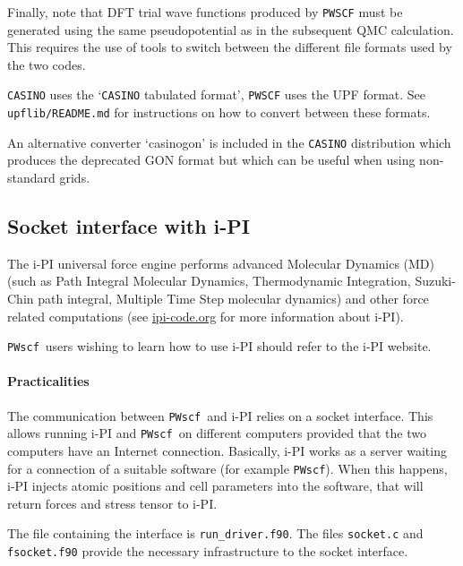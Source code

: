 \documentclass[12pt,a4paper]{article}
\def\PWscf{\texttt{PWscf}}
\begin{document}
Finally, note that DFT trial wave functions produced by \texttt{PWSCF}
must be generated using the same pseudopotential as in the subsequent QMC 
calculation. This requires the use of tools to switch between the different 
file formats used by the two codes.

\texttt{CASINO} uses the `\texttt{CASINO} tabulated format', \texttt{PWSCF} 
uses the UPF format. See \texttt{upflib/README.md} for instructions on how
to convert between these formats.

An alternative converter `casinogon' is included in the \texttt{CASINO} distribution which produces the deprecated GON format but which can be useful when using non-standard grids.

\subsection{Socket interface with i-PI}

The i-PI universal force engine performs advanced Molecular Dynamics
(MD) (such as Path Integral Molecular Dynamics, Thermodynamic
Integration, Suzuki-Chin path integral, Multiple Time Step molecular
dynamics) and other force related computations (see \url{ipi-code.org}
for more information about i-PI).  

\PWscf\ users wishing to learn how to use i-PI should refer to the i-PI website.

\paragraph{Practicalities}
The communication between \PWscf\ and i-PI relies on a socket
interface. This allows running i-PI and \PWscf\ on different computers
provided that the two computers have an Internet
connection. Basically, i-PI works as a server waiting for a connection
of a suitable software (for example \PWscf). When this happens, i-PI
injects atomic positions and cell parameters into the software, that
will return forces and stress tensor to i-PI.  

The file containing the interface is \verb#run_driver.f90#. The files
\verb#socket.c# and \verb#fsocket.f90# provide the necessary
infrastructure to the socket interface.  
\end{document}
